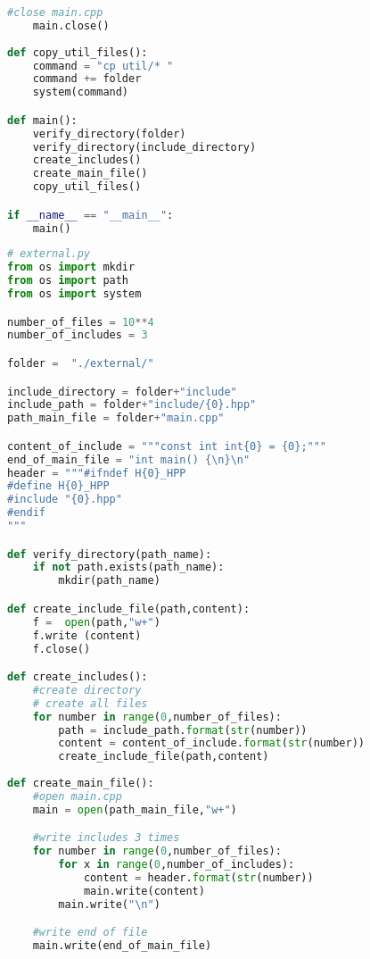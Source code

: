 \begin{apendicesenv}
\begin{lstlisting}[language=Python, caption={
     Script Guardas de Inclusão Externa mais pragma once},
                  label=script_external_pragma_include]
    #close main.cpp
    main.close()
                                                                                  
def copy_util_files():                                                           
    command = "cp util/* "                                                       
    command += folder                                                            
    system(command)      

def main():
    verify_directory(folder)
    verify_directory(include_directory)
    create_includes()
    create_main_file()
    copy_util_files()

if __name__ == "__main__":
    main()
\end{lstlisting}

\begin{lstlisting}[language=Python,caption={
            Script Guardas de Inclusão Externa },
                   label=script_external_include]
# external.py
from os import mkdir
from os import path
from os import system

number_of_files = 10**4
number_of_includes = 3

folder =  "./external/"

include_directory = folder+"include"
include_path = folder+"include/{0}.hpp"
path_main_file = folder+"main.cpp"

content_of_include = """const int int{0} = {0};"""
end_of_main_file = "int main() {\n}\n"
header = """#ifndef H{0}_HPP
#define H{0}_HPP
#include "{0}.hpp"
#endif
"""

def verify_directory(path_name):
    if not path.exists(path_name):
        mkdir(path_name)

def create_include_file(path,content):
    f =  open(path,"w+")
    f.write (content)
    f.close()

def create_includes():
    #create directory
    # create all files
    for number in range(0,number_of_files):
        path = include_path.format(str(number))
        content = content_of_include.format(str(number))
        create_include_file(path,content)
    
def create_main_file():
    #open main.cpp
    main = open(path_main_file,"w+")

    #write includes 3 times
    for number in range(0,number_of_files):
        for x in range(0,number_of_includes):
            content = header.format(str(number))
            main.write(content)
        main.write("\n")

    #write end of file
    main.write(end_of_main_file)


\end{lstlisting}
\end{apendicesenv}
